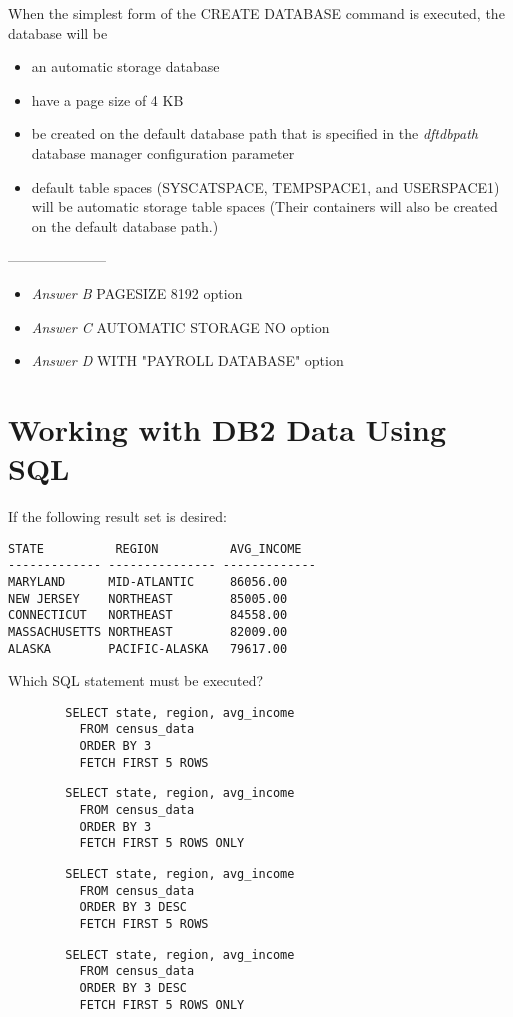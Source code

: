\documentclass[answers, 11pt]{exam}
\begin{document}
\begin{questions}
\begin{solution}
When the simplest form of the CREATE DATABASE command is executed, the database will be
\begin{itemize}
	\item an automatic storage database
	\item have a page size of 4 KB
	\item be created on the default database path that is specified in the \textit{dftdbpath} database manager configuration parameter
	\item default table spaces (SYSCATSPACE, TEMPSPACE1, and USERSPACE1) will be automatic storage table spaces (Their containers will also be created on
	the default database path.)
\end{itemize}	
---------------------

\begin{itemize}
	\item \textit{Answer B} PAGESIZE 8192 option
	\item \textit{Answer C} AUTOMATIC STORAGE NO option
	\item \textit{Answer D} WITH "PAYROLL DATABASE" option 
\end{itemize}
\end{solution}

\newpage
\section{Working with DB2 Data Using SQL}
\question[1]
If the following result set is desired:
\begin{verbatim}
STATE          REGION          AVG_INCOME
------------- --------------- -------------
MARYLAND      MID-ATLANTIC     86056.00
NEW JERSEY    NORTHEAST        85005.00
CONNECTICUT   NORTHEAST        84558.00
MASSACHUSETTS NORTHEAST        82009.00
ALASKA        PACIFIC-ALASKA   79617.00
\end{verbatim}
Which SQL statement must be executed?
\begin{choices}
\choice \begin{verbatim}
		SELECT state, region, avg_income
		  FROM census_data
		  ORDER BY 3
		  FETCH FIRST 5 ROWS
		\end{verbatim}
\choice \begin{verbatim}
		SELECT state, region, avg_income
		  FROM census_data
		  ORDER BY 3
		  FETCH FIRST 5 ROWS ONLY
	    \end{verbatim}
\choice \begin{verbatim}
		SELECT state, region, avg_income
		  FROM census_data
		  ORDER BY 3 DESC
		  FETCH FIRST 5 ROWS
		\end{verbatim}
\CorrectChoice \begin{verbatim}
		SELECT state, region, avg_income
		  FROM census_data
		  ORDER BY 3 DESC
		  FETCH FIRST 5 ROWS ONLY
        \end{verbatim}
\end{choices}


\end{questions}
\end{document}
